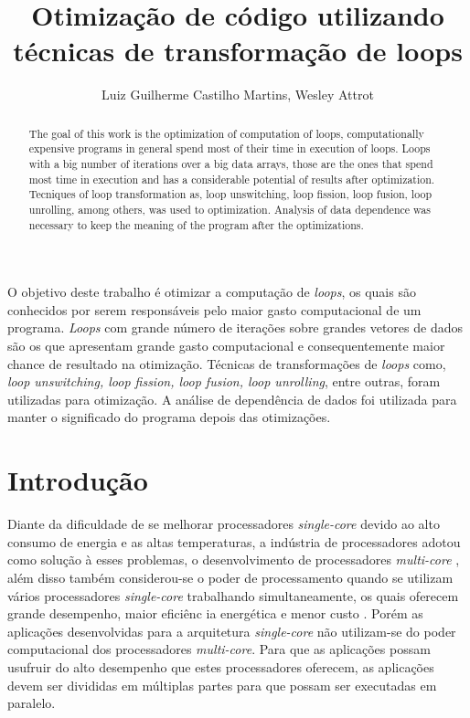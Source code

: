 \documentclass[12pt]{article}
\title{Otimização de código utilizando técnicas de transformação de loops}
\author{Luiz Guilherme Castilho Martins\inst{1}, Wesley Attrot\inst{1} }
\begin{document}
 
\maketitle
\begin{abstract}
        The goal of this work is the optimization of computation of loops,
        computationally expensive programs in general spend most of their time
        in execution of loops.
        Loops with a big number of iterations over a big data arrays, those are
        the ones that spend most time in execution and has a considerable
        potential of results after optimization.
        Tecniques of loop transformation as, loop unswitching, loop fission,
        loop fusion, loop unrolling, among others, was used to optimization.
        Analysis of data dependence was necessary to keep the meaning of the 
        program after the optimizations.
\end{abstract}

\begin{resumo} 
        O objetivo deste trabalho é otimizar a computação de \textit{loops}, os 
        quais são conhecidos por serem responsáveis pelo maior gasto 
        computacional de um programa. 
        \textit{Loops} com grande número de iterações sobre grandes vetores de 
        dados são os que apresentam grande gasto computacional e 
        consequentemente maior chance de resultado na otimização.
        Técnicas de transformações de \textit{loops} como, \textit{loop 
        unswitching, loop fission, loop fusion, loop unrolling}, entre outras, 
        foram utilizadas para otimização.
        A análise de dependência de dados foi utilizada para manter o 
        significado do programa depois das otimizações.
\end{resumo}
\section{Introdução}



Diante da  dificuldade de se melhorar processadores \textit{single-core} devido 
ao alto consumo de energia e as altas
temperaturas, a indústria de processadores adotou como solução à esses problemas, 
o desenvolvimento de processadores \textit{multi-core} \cite{Suleman:2008}, 
além disso também considerou-se o poder de processamento quando se utilizam 
vários processadores \textit{single-core} 
trabalhando simultaneamente, os quais oferecem grande desempenho, maior 
eficiênc ia energética e menor custo \cite{realcloudWehner}.
Porém as aplicações desenvolvidas para a arquitetura \textit{single-core} não 
utilizam-se do poder computacional dos processadores \textit{multi-core}.
Para que as aplicações possam usufruir do alto desempenho que estes 
processadores oferecem, as aplicações devem ser 
divididas em múltiplas partes para que possam ser executadas em paralelo.
\end{document}
